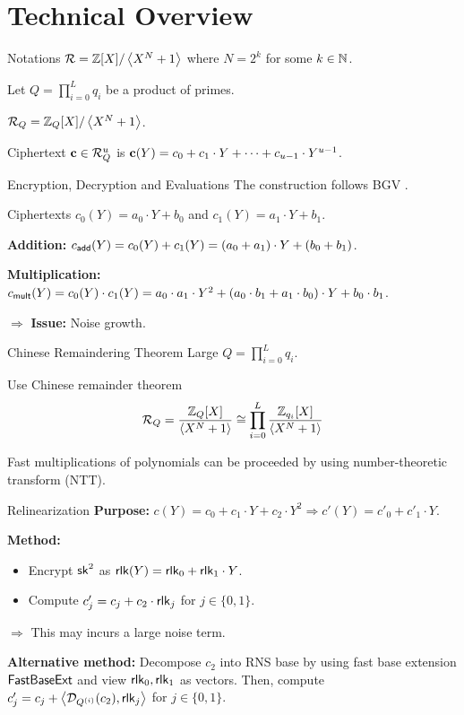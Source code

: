 \section{Technical Overview}
\begin{frame}{Notations}
	$\mathcal{R} = \mathbb{Z}[X] / \left\langle X^N + 1\right\rangle$ where $N = 2^k$ for some $k \in \mathbb{N}$.
	
	Let $Q = \prod_{i = 0}^L q_i$ be a product of primes.
	
	$\mathcal{R}_Q = \mathbb{Z}_Q[X]/ \left\langle X^N + 1\right\rangle$.
	
	Ciphertext $\mathbf{c} \in \mathcal{R}_Q^u$ is $\mathbf{c}(Y) = c_0 + c_1 \cdot Y + \dots + c_{u - 1} \cdot Y^{u-1}$.
\end{frame}

\begin{frame}{Encryption, Decryption and Evaluations}
	The construction follows BGV \cite{ITCS:BraGenVai12}.
	
	Ciphertexts $c_0(Y) = a_0\cdot Y + b_0$ and $c_1(Y) = a_1 \cdot Y + b_1$.
	
	\textbf{Addition:} $c_{\mathsf{add}}(Y) = c_0(Y) + c_1(Y) = (a_0 + a_1)\cdot Y + (b_0 + b_1)$.
	
	\textbf{Multiplication:} $c_{\mathsf{mult}}(Y) = c_0(Y)\cdot c_1(Y) = a_0\cdot a_1 \cdot Y^2 + (a_0\cdot b_1 + a_1 \cdot b_0) \cdot Y + b_0\cdot b_1$.
	
	$\Rightarrow$ \textbf{Issue:} Noise growth.
	
\end{frame}

\begin{frame}{Chinese Remaindering Theorem}
	Large $Q = \prod_{i = 0}^L q_i$.
	
	Use Chinese remainder theorem
	\begin{equation*}
		\mathcal{R}_Q = \frac{\mathbb{Z}_Q[X]}{\left\langle X^N + 1\right\rangle} \cong \prod_{i = 0}^L \frac{\mathbb{Z}_{q_i}[X]}{\left\langle X^N + 1\right\rangle}
	\end{equation*}
	
	Fast multiplications of polynomials can be proceeded by using number-theoretic transform (NTT).
\end{frame}

\begin{frame}{Relinearization}
	\textbf{Purpose:} $c(Y) = c_0 + c_1 \cdot Y + c_2 \cdot Y^2 \Rightarrow c'(Y) = c'_0 + c'_1 \cdot Y$.
	
	\textbf{Method:}
	\begin{itemize}
		\item Encrypt $\mathsf{sk}^2$ as $\mathsf{rlk}(Y) = \mathsf{rlk}_0 + \mathsf{rlk}_1 \cdot Y$. 
		\item Compute $c'_j = c_j + c_2 \cdot \mathsf{rlk}_j$ for $j \in \{0,1\}$.
	\end{itemize} 
	
	$\Rightarrow$ This may incurs a large noise term.
	
	\textbf{Alternative method:} Decompose $c_2$ into RNS base by using fast base extension $\mathsf{FastBaseExt}$ and view $\mathsf{rlk}_0, \mathsf{rlk}_1$ as vectors. Then, compute $c'_j = c_j + \left\langle\mathcal{D}_{Q^{(i)}}(c_2),\mathsf{rlk}_j\right\rangle$ for $j \in \{0,1\}$.
\end{frame}

